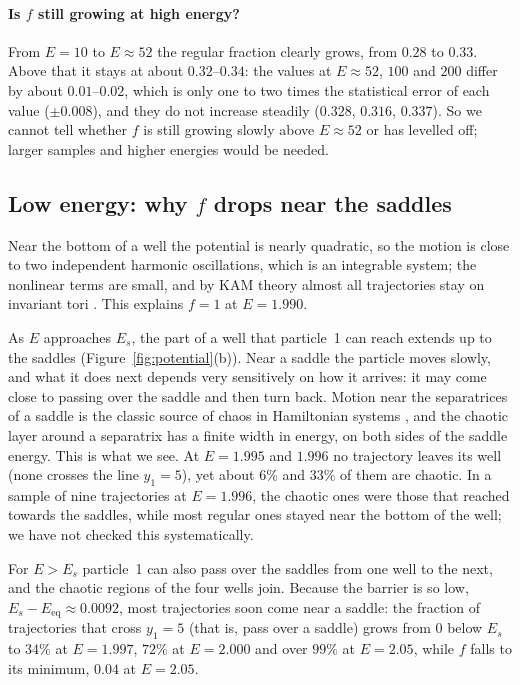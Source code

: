 \documentclass[11pt,a4paper]{article}
\newcommand{\Eeq}{E_{\mathrm{eq}}}
\begin{document}
\paragraph{Is $f$ still growing at high energy?}
From $E=10$ to $E\approx52$ the regular fraction clearly grows, from $0.28$ to
$0.33$. Above that it stays at about $0.32$--$0.34$: the values at $E\approx52$,
$100$ and $200$ differ by about $0.01$--$0.02$, which is only one to two times
the statistical error of each value ($\pm0.008$), and they do not increase
steadily ($0.328$, $0.316$, $0.337$). So we cannot tell whether $f$ is still
growing slowly above $E\approx52$ or has levelled off; larger samples and
higher energies would be needed.

\subsection{Low energy: why $f$ drops near the saddles}\label{sec:transition}
Near the bottom of a well the potential is nearly quadratic, so the motion is
close to two independent harmonic oscillations, which is an integrable system;
the nonlinear terms are small, and by KAM theory almost all trajectories stay
on invariant tori \cite{lichtenberg1992}. This explains $f=1$ at $E=1.990$.

As $E$ approaches $E_s$, the part of a well that particle~1 can reach extends
up to the saddles (Figure~\ref{fig:potential}(b)). Near a saddle the particle
moves slowly, and what it does next depends very sensitively on how it
arrives: it may come close to passing over the saddle and then turn back.
Motion near the separatrices of a saddle is the classic source of chaos in
Hamiltonian systems \cite{lichtenberg1992}, and the chaotic layer around a
separatrix has a finite width in energy, on both sides of the saddle energy.
This is what we see. At $E=1.995$ and $1.996$ no trajectory leaves its well
(none crosses the line $y_1=5$), yet about $6\%$ and $33\%$ of them are
chaotic. In a sample of nine trajectories at $E=1.996$, the chaotic ones were
those that reached towards the saddles, while most regular ones stayed near
the bottom of the well; we have not checked this systematically.

For $E>E_s$ particle~1 can also pass over the saddles from one well to the
next, and the chaotic regions of the four wells join. Because the barrier is
so low, $E_s-\Eeq\approx0.0092$, most trajectories soon come near a saddle:
the fraction of trajectories that cross $y_1=5$ (that is, pass over a saddle)
grows from $0$ below $E_s$ to $34\%$ at $E=1.997$, $72\%$ at $E=2.000$ and
over $99\%$ at $E=2.05$, while $f$ falls to its minimum, $0.04$ at $E=2.05$.
\end{document}
